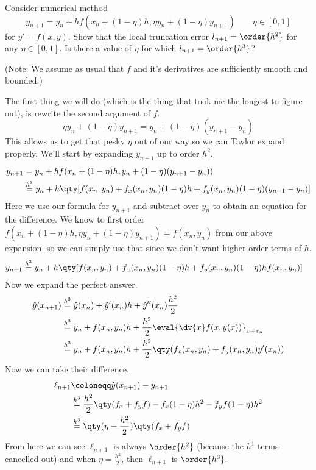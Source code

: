 \documentclass[boxes,pages]{homework}
\newcommand{\eqorder}[1]{\overset{h^#1}{=}}
\begin{document}
\begin{problem}
Consider numerical method
\[
	y_{n+1} = y_n + hf(x_n + (1 - \eta)h, \eta y_n + (1 - \eta)y_{n+1})\qquad \eta\in[0, 1]
\]
for $y' = f(x, y)$. Show that the local truncation error $l_{n+1} = \order{h^2}$ for any $\eta\in[0, 1]$. Is there a value of $\eta$ for which $l_{n+1} = \order{h^3}$?

(Note: We assume as usual that $f$ and it's derivatives are sufficiently smooth and bounded.)
\end{problem}

\begin{solution}
	The first thing we will do (which is the thing that took me the longest to figure out), is rewrite the second argument of $f$.
	\begin{equation*}
		\eta y_n + (1 - \eta)y_{n+1} = y_n + (1 - \eta)(y_{n+1} - y_n)
	\end{equation*}
	This allows us to get that pesky $\eta$ out of our way so we can Taylor expand properly.
	We'll start by expanding $y_{n+1}$ up to order $h^2$.
	\begin{align*}
		y_{n+1} & = y_n + hf(x_n + (1 - \eta)h, y_n + (1 - \eta)(y_{n+1} - y_n))                                           \\
		        & \eqorder{3} y_n + h\qty[f(x_n, y_n) + f_x(x_n, y_n)(1 - \eta)h + f_y(x_n, y_n)(1 - \eta)(y_{n+1} - y_n)]
	\end{align*}
	Here we use our formula for $y_{n+1}$ and subtract over $y_n$ to obtain an equation for the difference.
	We know to first order $f(x_n + (1 - \eta)h, \eta y_n + (1 - \eta)y_{n+1}) = f(x_n, y_n)$ from our above expansion, so we can simply use that since we don't want higher order terms of $h$.
	\begin{align*}
		y_{n+1} & \eqorder{3} y_n + h\qty[f(x_n, y_n) + f_x(x_n, y_n)(1 - \eta)h + f_y(x_n, y_n)(1 - \eta)hf(x_n, y_n)]
	\end{align*}
	Now we expand the perfect answer.
	\begin{align*}
		\hat{y}(x_{n+1}) & \eqorder{3} \hat{y}(x_n) + \hat{y}'(x_n)h + \hat{y}''(x_n)\frac{h^2}{2}                  \\
		                 & \eqorder{3} y_n + f(x_n, y_n)h + \frac{h^2}{2}\eval{\dv{x}f(x, y(x))}_{x = x_n}          \\
		                 & \eqorder{3} y_n + f(x_n, y_n)h + \frac{h^2}{2}\qty(f_x(x_n, y_n) + f_y(x_n, y_n)y'(x_n))
	\end{align*}
	Now we can take their difference.
	\begin{align*}
		\ell_{n+1} & \coloneqq \hat{y}(x_{n+1}) - y_{n+1}                                             \\
		           & \eqorder{3} \frac{h^2}{2}\qty(f_x + f_yf) - f_x(1 - \eta)h^2 - f_yf(1 - \eta)h^2 \\
		           & \eqorder{3} \qty(\eta - \frac{h^2}{2})\qty(f_x + f_yf)
	\end{align*}
	From here we can see $\ell_{n+1}$ is always $\order{h^2}$ (because the $h^1$ terms cancelled out) and when $\eta = \frac{h^2}{2}$, then $\ell_{n+1}$ is $\order{h^3}$.
\end{solution}
\end{document}
